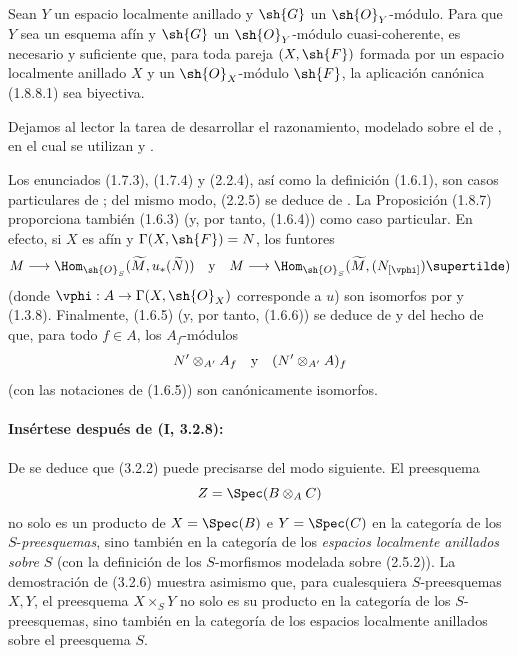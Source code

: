 \documentclass[oneside,10pt]{amsart}
\makeatletter
\newcommand{\ega@arrow}[2]{\mathchoice{#1}{#2}{#2}{#2}}
\renewcommand{\to}{\ega@arrow{\longrightarrow}{\rightarrow}}
\let\EGAOriginalLabel\label
\renewcommand{\label}[1]{\phantomsection\EGAOriginalLabel{#1}}
\makeatother
\begin{document}
\begin{corollary}[1.8.10]
\label{ega2:addendum:I.1.8.10}
Sean $Y$ un espacio localmente anillado y $\sh{G}$ un
$\sh{O}_Y$-módulo. Para que $Y$ sea un esquema afín y $\sh{G}$ un
$\sh{O}_Y$-módulo cuasi-coherente, es necesario y suficiente que, para
toda pareja $(X,\sh{F})$ formada por un espacio localmente anillado $X$
y un $\sh{O}_X$-módulo $\sh{F}$, la aplicación canónica \textup{(1.8.8.1)} sea
biyectiva.
\end{corollary}

Dejamos al lector la tarea de desarrollar el razonamiento, modelado
sobre el de , en el cual se utilizan  y
.

\begin{remark}[1.8.11]
\label{ega2:addendum:I.1.8.11}
Los enunciados (1.7.3), (1.7.4) y (2.2.4), así como la
definición (1.6.1), son casos particulares de ; del
mismo modo, (2.2.5) se deduce de . La Proposición
(1.8.7) proporciona también (1.6.3) (y, por tanto, (1.6.4)) como
caso particular. En efecto, si $X$ es afín y $\Gamma(X,\sh{F})=N$, los
funtores
\[
  M\to
  \Hom_{\sh{O}_S}(\widetilde M,u_*(\widetilde N))
  \quad\hbox{y}\quad
  M\to
  \Hom_{\sh{O}_S}(\widetilde M,(N_{[\vphi]})\supertilde)
\]
(donde $\vphi:A\to\Gamma(X,\sh{O}_X)$ corresponde a $u$) son
isomorfos por  y (1.3.8). Finalmente, (1.6.5) (y,
por tanto, (1.6.6)) se deduce de  y del hecho de que,
para todo $f\in A$, los $A_f$-módulos
\[
  N'\otimes_{A'}A_f
  \quad\hbox{y}\quad
  (N'\otimes_{A'}A)_f
\]
(con las notaciones de (1.6.5)) son canónicamente isomorfos.
\end{remark}

\paragraph{Insértese después de (I, 3.2.8):}

\begin{env}[3.2.9]
\label{ega2:addendum:I.3.2.9}
De  se deduce que (3.2.2) puede precisarse del modo
siguiente. El preesquema
\[
  Z=\Spec(B\otimes_A C)
\]
no solo es un producto de $X=\Spec(B)$ e $Y=\Spec(C)$ en la categoría
de los $S$-\emph{preesquemas}, sino también en la categoría de los \emph{espacios
localmente anillados} \emph{sobre} $S$ (con la definición de los
$S$-morfismos modelada sobre (2.5.2)). La demostración de (3.2.6)
muestra asimismo que, para cualesquiera $S$-preesquemas $X,Y$, el
preesquema $X\times_S Y$ no solo es su producto en la categoría de los
$S$-preesquemas, sino también en la categoría de los espacios
localmente anillados sobre el preesquema $S$.
\end{env}
\end{document}
